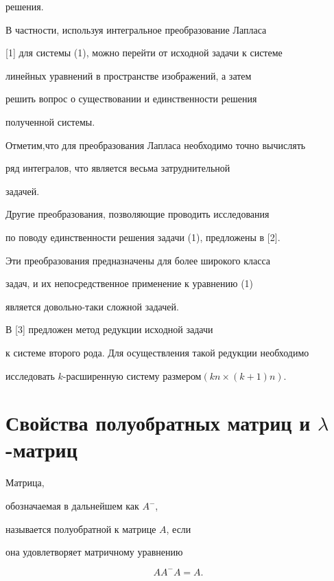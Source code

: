 решения. 


В частности, используя интегральное преобразование Лапласа 


[1] для системы (1), можно перейти от исходной задачи к системе 


линейных уравнений в пространстве изображений, а затем 


решить вопрос о существовании и единственности решения 


полученной системы. 


Отметим,что для преобразования Лапласа необходимо точно вычислять 


ряд интегралов, что является весьма затруднительной 


задачей. 


 


Другие преобразования, позволяющие проводить исследования 


по поводу единственности решения задачи (1), предложены в [2]. 


Эти преобразования предназначены для более широкого класса 


задач, и их непосредственное применение к уравнению (1) 


является довольно-таки сложной задачей. 


 


В [3] предложен метод редукции исходной задачи 


к системе второго рода. Для осуществления такой редукции необходимо 


исследовать $k$-расширенную систему размером\linebreak $(kn\times(k+1)n)$. 


 


\section{Свойства полуобратных матриц и $\lambda$-матриц} 


 


\begin{defn} Матрица, 


обозначаемая в дальнейшем как $A^-$, 


называется полуобратной к матрице $A$, если 


она удовлетворяет матричному уравнению 


$$ 


AA^-A=A. 


$$ 


\end{defn} 


